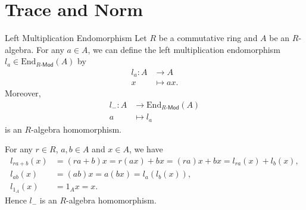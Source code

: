 \section{Trace and Norm}

\begin{lemma}{Left Multiplication Endomorphism}{}
    Let $R$ be a commutative ring and $A$ be an $R$-algebra. For any $a\in A$, we can define the left multiplication endomorphism $l_a\in\mathrm{End}_{R\text{-}\mathsf{Mod}}(A)$ by
    \begin{align*}
        l_a:A &\longrightarrow A\\
        x &\longmapsto ax.
    \end{align*}
    Moreover,
    \begin{align*}
        l_{-}:A &\longrightarrow \mathrm{End}_{R\text{-}\mathsf{Mod}}(A)\\
        a &\longmapsto l_a
    \end{align*}
    is an $R$-algebra homomorphism.
\end{lemma}
\begin{prf}
    For any $r\in R$, $a,b\in A$ and $x\in A$, we have
    \begin{align*}
        l_{ra+b}(x)&=(ra+b)x=r(ax)+bx=(ra)x+bx=l_{ra}(x)+l_b(x),\\
        l_{ab}(x)&=(ab)x=a(bx)=l_a(l_b(x)),\\
        l_{1_A}(x)&=1_Ax=x.
    \end{align*}
    Hence $l_{-}$ is an $R$-algebra homomorphism.
\end{prf}


